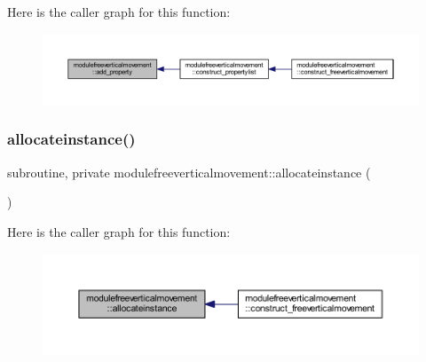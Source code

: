Here is the caller graph for this function\+:\nopagebreak
\begin{figure}[H]
\begin{center}
\leavevmode
\includegraphics[width=350pt]{namespacemodulefreeverticalmovement_a9138567f31f0c9e91b69d5268c3855ce_icgraph}
\end{center}
\end{figure}
\mbox{\label{namespacemodulefreeverticalmovement_a07f25d7228ee74ef7003eea9ba19e494}} 
\subsubsection{\texorpdfstring{allocateinstance()}{allocateinstance()}}
{\footnotesize\ttfamily subroutine, private modulefreeverticalmovement\+::allocateinstance (\begin{DoxyParamCaption}{ }\end{DoxyParamCaption})\hspace{0.3cm}{\ttfamily [private]}}

Here is the caller graph for this function\+:\nopagebreak
\begin{figure}[H]
\begin{center}
\leavevmode
\includegraphics[width=350pt]{namespacemodulefreeverticalmovement_a07f25d7228ee74ef7003eea9ba19e494_icgraph}
\end{center}
\end{figure}
\mbox{\label{namespacemodulefreeverticalmovement_a7ec18a4b674d7b9ea1339f2a93116e0a}} 
